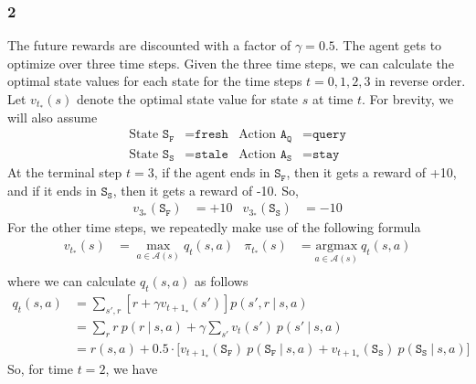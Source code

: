 \documentclass[11pt]{article}
\begin{document}
    \subsubsection*{2}
    The future rewards are discounted with a factor of $\gamma = 0.5$. The agent gets to optimize over three time steps. Given
    the three time steps, we can calculate the optimal state values for each state for the time steps $t = 0, 1, 2, 3$ in
    reverse order. Let $v_{t_{*}}(s)$ denote the optimal state value for state $s$ at time $t$. For brevity, we will also assume
    \begin{align*}
        \text{State } \texttt{S}_{\texttt{F}} &= \texttt{fresh} & \text{Action } \texttt{A}_{\texttt{Q}} &= \texttt{query} \\
        \text{State } \texttt{S}_{\texttt{S}} &= \texttt{stale} & \text{Action } \texttt{A}_{\texttt{S}} &= \texttt{stay}
    \end{align*}
    At the terminal step $t = 3$, if the agent ends in $\texttt{S}_{\texttt{F}}$, then it gets a reward of +10, and if it ends in
    $\texttt{S}_{\texttt{S}}$, then it gets a reward of -10. So,
    \begin{align*}
        v_{3_{*}}(\texttt{S}_{\texttt{F}}) &= +10 & v_{3_{*}}(\texttt{S}_{\texttt{S}}) &= -10
    \end{align*}
    For the other time steps, we repeatedly make use of the following formula
    \begin{align*}
        v_{t_{*}}(s) &= \max_{a \in \mathcal{A}(s)} q_{t}(s, a) &
        \pi_{t_{*}}(s) &= \underset{a \in \mathcal{A}(s)}{\mathrm{argmax}} \ q_{t}(s, a) \\
    \end{align*}
    where we can calculate $q_{t}(s, a)$ as follows
    \begin{align*}
        q_{t}(s, a) &= \sum_{s', r} \left[ r + \gamma v_{{t+1}_{*}}(s') \right] p(s', r \ | \ s, a) \\
        &= \sum_{r} r \ p(r \ | \ s, a) + \gamma \sum_{s'} v_{t}(s') \ p(s' \ | \ s, a) \\
        &= r(s, a) + 0.5 \cdot \big[ v_{{t+1}_{*}}(\texttt{S}_{\texttt{F}}) \ p(\texttt{S}_{\texttt{F}} \ | \ s, a)
        + v_{{t+1}_{*}}(\texttt{S}_{\texttt{S}}) \ p(\texttt{S}_{\texttt{S}} \ | \ s, a) \big]
    \end{align*}
    So, for time $t = 2$, we have
\end{document}
